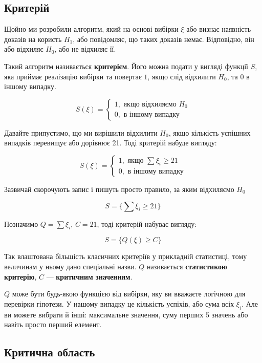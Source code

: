 \documentclass[
  letterpaper,
  10pt,
  openany]{report}
\theoremstyle{definition}
\theoremstyle{remark}
\begin{document}
\subsection{Критерій}\label{ux43aux440ux438ux442ux435ux440ux456ux439}

Щойно ми розробили алгоритм, який на основі вибірки \(\xi\) або визнає
наявність доказів на користь \(H_1\), або повідомляє, що таких доказів
немає. Відповідно, він або відхиляє \(H_0\), або не відхиляє її.

Такий алгоритм називається \textbf{критерієм}. Його можна подати у
вигляді функції \(S\), яка приймає реалізацію вибірки та повертає \(1\),
якщо слід відхилити \(H_0\), та \(0\) в іншому випадку.

\[
S(\xi) = \begin{cases}
    1, \text{ якщо відхиляємо } H_0 \\
    0, \text{ в іншому випадку}
\end{cases}
\]

Давайте припустимо, що ми вирішили відхилити \(H_0\), якщо кількість
успішних випадків перевищує або дорівнює 21. Тоді критерій набуде
вигляду:

\[
S(\xi) = \begin{cases}
    1, \text{ якщо } \sum \xi_i \geqslant 21 \\
    0, \text{ в іншому випадку}
\end{cases}
\]

Зазвичай скорочують запис і пишуть просто правило, за яким відхиляємо
\(H_0\)

\[
S = \{\sum \xi_i \geqslant 21\} 
\]

Позначимо \(Q = \sum \xi_i\), \(C = 21\), тоді критерій набуває вигляду:

\[
S = \{Q(\xi) \geqslant C\} 
\]

Так влаштована більшість класичних критеріїв у прикладній статистиці,
тому величинам у ньому дано спеціальні назви. \(Q\) називається
\textbf{статистикою критерію}, \(C\) --- \textbf{критичним значенням}.

\(Q\) може бути будь-якою функцією від вибірки, яку ви вважаєте логічною
для перевірки гіпотези. У нашому випадку це кількість успіхів, або сума
всіх \(\xi_i\). Але ви можете вибрати й інші: максимальне значення, суму
перших 5 значень або навіть просто перший елемент.

\subsection{Критична
область}\label{ux43aux440ux438ux442ux438ux447ux43dux430-ux43eux431ux43bux430ux441ux442ux44c}
\end{document}
